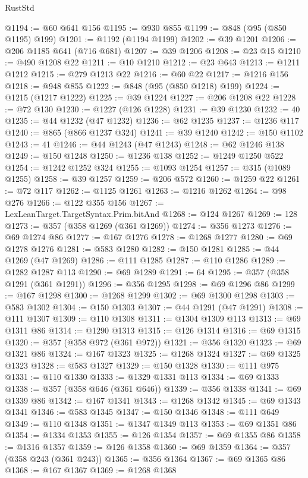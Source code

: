 \begin{lexlean}{RustStd}
\begin{coremodule}
@1194 := @60 @641 @156
@1195 := @930 @855
@1199 := @848 (@95 (@850 @1195) @199)
@1201 := @1192 (@1194 @1199)
@1202 := @39 @1201
@1206 := @206 @1185 @641 (@716 @681)
@1207 := @39 @1206
@1208 := @23 @15
@1210 := @490 @1208 @22
@1211 := @10 @1210
@1212 := @23 @643
@1213 := @1211 @1212
@1215 := @279 @1213 @22
@1216 := @60 @22
@1217 := @1216 @156
@1218 := @948 @855
@1222 := @848 (@95 (@850 @1218) @199)
@1224 := @1215 (@1217 @1222)
@1225 := @39 @1224
@1227 := @206 @1208 @22
@1228 := @72 @130
@1230 := @1227 (@126 @1228)
@1231 := @39 @1230
@1232 := 40
@1235 := @44 @1232 (@47 @1232)
@1236 := @62 @1235
@1237 := @1236 @117
@1240 := @865 (@866 @1237 @324)
@1241 := @39 @1240
@1242 := @150 @1102
@1243 := 41
@1246 := @44 @1243 (@47 @1243)
@1248 := @62 @1246 @138
@1249 := @150 @1248
@1250 := @1236 @138
@1252 := @1249 @1250 @522
@1254 := @1242 @1252 @324
@1255 := @1093 @1254
@1257 := @315 (@1089 @1255)
@1258 := @39 @1257
@1259 := @206 @572
@1260 := @1259 @22
@1261 := @72 @117
@1262 := @1125 @1261
@1263 := @1216 @1262
@1264 := @98 @276
@1266 := @122 @355 @156
@1267 := LexLeanTarget.TargetSyntax.Prim.bitAnd
@1268 := @124 @1267
@1269 := 128
@1273 := @357 (@358 @1269 (@361 @1269))
@1274 := @356 @1273
@1276 := @69 @1274 @86
@1277 := @167 @1276
@1278 := @1268 @1277
@1280 := @69 @1278 @1276
@1281 := @583 @1280
@1282 := @150 @1281
@1285 := @44 @1269 (@47 @1269)
@1286 := @111 @1285
@1287 := @110 @1286
@1289 := @1282 @1287 @113
@1290 := @69 @1289
@1291 := 64
@1295 := @357 (@358 @1291 (@361 @1291))
@1296 := @356 @1295
@1298 := @69 @1296 @86
@1299 := @167 @1298
@1300 := @1268 @1299
@1302 := @69 @1300 @1298
@1303 := @583 @1302
@1304 := @150 @1303
@1307 := @44 @1291 (@47 @1291)
@1308 := @111 @1307
@1309 := @110 @1308
@1311 := @1304 @1309 @113
@1313 := @69 @1311 @86
@1314 := @1290 @1313
@1315 := @126 @1314
@1316 := @69 @1315
@1320 := @357 (@358 @972 (@361 @972))
@1321 := @356 @1320
@1323 := @69 @1321 @86
@1324 := @167 @1323
@1325 := @1268 @1324
@1327 := @69 @1325 @1323
@1328 := @583 @1327
@1329 := @150 @1328
@1330 := @111 @975
@1331 := @110 @1330
@1333 := @1329 @1331 @113
@1334 := @69 @1333
@1338 := @357 (@358 @646 (@361 @646))
@1339 := @356 @1338
@1341 := @69 @1339 @86
@1342 := @167 @1341
@1343 := @1268 @1342
@1345 := @69 @1343 @1341
@1346 := @583 @1345
@1347 := @150 @1346
@1348 := @111 @649
@1349 := @110 @1348
@1351 := @1347 @1349 @113
@1353 := @69 @1351 @86
@1354 := @1334 @1353
@1355 := @126 @1354
@1357 := @69 @1355 @86
@1358 := @1316 @1357
@1359 := @126 @1358
@1360 := @69 @1359
@1364 := @357 (@358 @243 (@361 @243))
@1365 := @356 @1364
@1367 := @69 @1365 @86
@1368 := @167 @1367
@1369 := @1268 @1368

\end{coremodule}
\end{lexlean}

